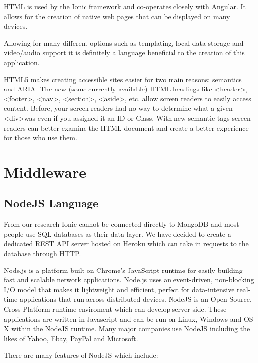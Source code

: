 HTML is used by the Ionic framework and co-operates closely with Angular. It allows for the creation of native web pages that can be displayed on many devices.

Allowing for many different options such as templating, local data storage and video/audio support it is definitely a language beneficial to the creation of this application.

HTML5 makes creating accessible sites easier for two main reasons: semantics and ARIA. The new (some currently available) HTML headings like  \textless header\textgreater, \textless footer\textgreater, \textless nav\textgreater, \textless section\textgreater, \textless aside\textgreater, etc. allow screen readers to easily access content.\cite{html} Before, your screen readers had no way to determine what a given \textless div\textgreater  was even if you assigned it an ID or Class.\cite{html} With new semantic tags screen readers can better examine the HTML document and create a better experience for those who use them.\cite{html}



\section{Middleware}
\subsection{NodeJS Language}
From our research Ionic cannot be connected directly to MongoDB and most people use SQL databases as their data layer. We have decided to create a dedicated REST API server hosted on Heroku which can take in requests to the database through HTTP.

Node.js is a platform built on Chrome's JavaScript runtime for easily building fast and scalable network applications.\cite{node} Node.js uses an event-driven, non-blocking I/O model that makes it lightweight and efficient, perfect for data-intensive real-time applications that run across distributed devices. \cite{node} NodeJS is an Open Source, Cross Platform runtime enviroment which can develop server side. These applications are written in Javascript and can be run on Linux, Windows and OS X within the NodeJS runtime. Many major companies use NodeJS including the likes of Yahoo, Ebay, PayPal and Microsoft. 

There are many features of NodeJS which include:



